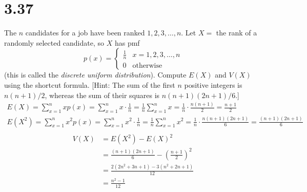 \documentclass[letterpaper,12pt,fleqn]{article}
\begin{document}
\section*{3.37}

The \(n\) candidates for a job have been ranked \(1,2,3,\ldots,n\).  Let \(X=\) the rank of a randomly selected candidate,
so \(X\) has pmf
\[p(x)=\begin{cases}
\frac{1}{n} & x=1,2,3,\ldots,n \\
0 & \text{otherwise}
\end{cases}\]
(this is called the \emph{discrete uniform distribution}).  Compute \(E(X)\) and \(V(X)\) using the shortcut formula.
   [Hint: The sum of the first \(n\) positive integers is \(n(n+1)/2\), whereas the sum of their squares is
     \(n(n+1)(2n+1)/6\).]
\begin{gather*}
  E(X)=\sum_{x=1}^nxp(x)=\sum_{x=1}^nx\cdot\frac{1}{n}=\frac{1}{n}\sum_{x=1}^nx=\frac{1}{n}\cdot\frac{n(n+1)}{2}=\frac{n+1}{2} \\
  E(X^2)=\sum_{x=1}^nx^2p(x)=\sum_{x=1}^nx^2\cdot\frac{1}{n}=\frac{1}{n}\sum_{x=1}^nx^2=
  \frac{1}{n}\cdot\frac{n(n+1)(2n+1)}{6}=\frac{(n+1)(2n+1)}{6} \\
\end{gather*}
\begin{align*}
  V(X) &= E(X^2)-E(X)^2 \\
  &= \frac{(n+1)(2n+1)}{6} - \left(\frac{n+1}{2}\right)^2 \\
  &= \frac{2(2n^2+3n+1)-3(n^2+2n+1)}{12} \\
  &= \frac{n^2-1}{12}
\end{align*}
\end{document}
